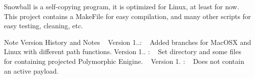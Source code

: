 Snowball is a self-\/copying program, it is optimized for Linux, at least for now. This project contains a Make\+File for easy compilation, and many other scripts for easy testing, cleaning, etc. \begin{DoxyNote}{Note}
Version History and Notes ~\newline
Version 1..\+: ~\newline
Added branches for Mac\+O\+SX and Linux with different path functions. Version 1.. \+: ~\newline
 Set directory and some files for containing projected Polymorphic Enigine. ~\newline
 Version 1. \+: ~\newline
 Does not contain an active payload. ~\newline

\end{DoxyNote}
